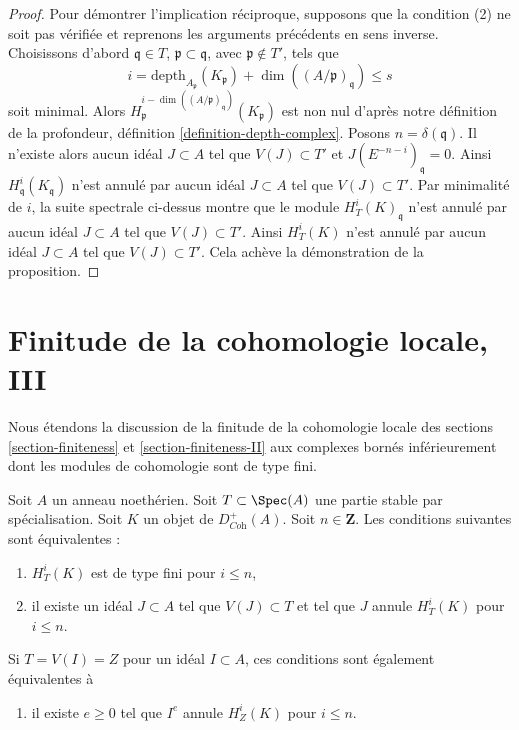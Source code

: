 \begin{proof}
\medskip\noindent
Pour démontrer l'implication réciproque, supposons que la condition (2) ne soit pas vérifiée et reprenons les arguments précédents en sens inverse. Choisissons d'abord $\mathfrak q \in T$, $\mathfrak p \subset \mathfrak q$, avec $\mathfrak p \not \in T'$, tels que
$$
i = \text{depth}_{A_\mathfrak p}(K_\mathfrak p) +
\dim((A/\mathfrak p)_\mathfrak q) \leq s
$$
soit minimal. Alors $H^{i - \dim((A/\mathfrak p)_\mathfrak q)}_\mathfrak p(K_\mathfrak p)$ est non nul d'après notre définition de la profondeur, définition \ref{definition-depth-complex}. Posons $n = \delta(\mathfrak q)$. Il n'existe alors aucun idéal $J \subset A$ tel que $V(J) \subset T'$ et $J(E^{-n - i})_\mathfrak q = 0$. Ainsi $H^i_\mathfrak q(K_\mathfrak q)$ n'est annulé par aucun idéal $J \subset A$ tel que $V(J) \subset T'$. Par minimalité de $i$, la suite spectrale ci-dessus montre que le module $H^i_T(K)_\mathfrak q$ n'est annulé par aucun idéal $J \subset A$ tel que $V(J) \subset T'$. Ainsi $H^i_T(K)$ n'est annulé par aucun idéal $J \subset A$ tel que $V(J) \subset T'$. Cela achève la démonstration de la proposition.
\end{proof}







\section{Finitude de la cohomologie locale, III}
\label{section-finiteness-III}

\noindent
Nous étendons la discussion de la finitude de la cohomologie locale des sections \ref{section-finiteness} et \ref{section-finiteness-II} aux complexes bornés inférieurement dont les modules de cohomologie sont de type fini.

\begin{lemma}
\label{lemma-check-finiteness-local-cohomology-by-annihilator-complex}
Soit $A$ un anneau noethérien. Soit $T \subset \Spec(A)$ une partie stable par spécialisation. Soit $K$ un objet de $D_{\textit{Coh}}^+(A)$. Soit $n \in \mathbf{Z}$. Les conditions suivantes sont équivalentes :
\begin{enumerate}
\item $H^i_T(K)$ est de type fini pour $i \leq n$,
\item il existe un idéal $J \subset A$ tel que $V(J) \subset T$ et tel que $J$ annule $H^i_T(K)$ pour $i \leq n$.
\end{enumerate}
Si $T = V(I) = Z$ pour un idéal $I \subset A$, ces conditions sont également équivalentes à
\begin{enumerate}
\item[(3)] il existe $e \geq 0$ tel que $I^e$ annule $H^i_Z(K)$ pour $i \leq n$.
\end{enumerate}
\end{lemma}

